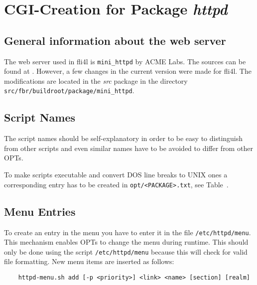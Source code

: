 
\section{CGI-Creation for Package \emph{httpd}}

\subsection{General information about the web server}

The web server used in fli4l is \texttt{mini\_httpd} by ACME
Labs. The sources can be found at
.
However, a few changes in the current version were made for fli4l.
The modifications are located in the \emph{src} package in the directory
\texttt{src/fbr/buildroot/package/mini\_httpd}.

\subsection{Script Names}

The script names should be self-explanatory in order to be
easy to distinguish from other scripts and even similar names
have to be avoided to differ from other OPTs.

To make scripts executable and convert DOS line breaks to UNIX ones
a corresponding entry has to be created in \texttt{opt/<PACKAGE>.txt}, see
Table~.

\subsection{Menu Entries}

To create an entry in the menu you have to enter it in the file
\texttt{/etc/httpd/menu}. This mechanism enables OPTs to change the menu during
runtime. This should only be done using the script \texttt{/etc/httpd/menu}
because this will check for valid file formatting. New menu items
are inserted as follows:

\begin{example}
\begin{verbatim}
    httpd-menu.sh add [-p <priority>] <link> <name> [section] [realm]
\end{verbatim}
\end{example}

